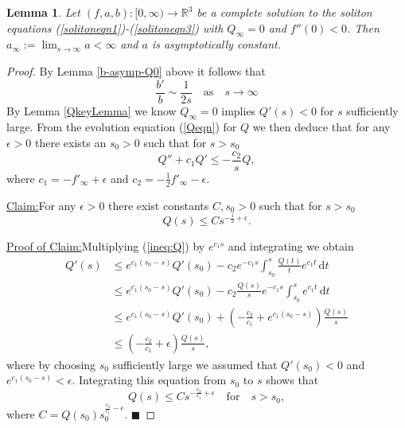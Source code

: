 \documentclass{amsart}
\newtheorem{lem}[thm]{Lemma}
\theoremstyle{definition}
\theoremstyle{remark}
\numberwithin{equation}{section}
\newcommand{\R}{\mathbb{R}}  %
\newenvironment{claim}[1]{\par\noindent\underline{Claim:}\space#1}{}
\newenvironment{claimproof}[1]{\par\noindent\underline{Proof of Claim:}\space#1}{\hfill $\blacksquare$}
\begin{document}
\begin{lem}
\label{a-asymp-Q0}
Let $(f,a,b): [0,\infty) \rightarrow \R^3$ be a complete solution to the soliton equations (\ref{solitoneqn1})-(\ref{solitoneqn3}) with $Q_\infty = 0$ and $f''(0) < 0$. Then $a_{\infty} := \lim_{s\rightarrow \infty} a <\infty$ and $a$ is asymptotically constant.
\end{lem}
\begin{proof}
By Lemma \ref{b-asymp-Q0} above it follows that 
\begin{equation*}
\frac{b'}{b} \sim \frac{1}{2s} \quad \textrm{as} \quad s \rightarrow \infty
\end{equation*}
By Lemma \ref{QkeyLemma} we know $Q_{\infty} = 0$ implies $Q'(s) < 0$ for $s$ sufficiently large. From the evolution equation (\ref{Qeqn}) for $Q$
we then deduce that for any $\epsilon > 0$ there exists an $s_0 > 0$ such that for $s > s_0$
\begin{equation}
\label{ineq:Q}
Q'' + c_1 Q' \leq -\frac{c_2}{s} Q,
\end{equation}
where $c_1  = -f'_{\infty} + \epsilon$ and $c_2 = -\frac{1}{2} f'_{\infty} - \epsilon $. 
\vspace{1em}
\begin{claim}
For any $\epsilon >0$ there exist constants $C, s_0 >0$ such that for $s > s_0$
\begin{equation*}
Q(s) \leq C s^{-\frac{1}{2} + \epsilon}.
\end{equation*}
\end{claim}
\begin{claimproof}
Multiplying (\ref{ineq:Q}) by $e^{c_1 s}$ and integrating we obtain
\begin{align*}
Q'(s) &\leq e^{c_1\left(s_0-s\right)} Q'(s_0) - c_2 e^{-c_1 s} \int_{s_0}^s \frac{Q(t)}{t} e^{c_1 t}  \, \mathrm{d}t \\
	  &\leq e^{c_1\left(s_0-s\right)} Q'(s_0) - c_2 \frac{Q(s)}{s} e^{-c_1 s} \int_{s_0}^s  e^{c_1 t} \, \mathrm{d}t \\
	  & \leq e^{c_1(s_0-s)} Q'(s_0) + \left( - \frac{c_2}{c_1} + e^{c_1 \left(s_0 - s\right)} \right) \frac{Q(s)}{s} \\
	  & \leq \left(-\frac{c_2}{c_1}+\epsilon\right) \frac{Q(s)}{s},
\end{align*}
where by choosing $s_0$ sufficiently large we assumed that $Q'(s_0) < 0$ and $e^{c_1 \left(s_0 - s\right)} < \epsilon$.
Integrating this equation from $s_0$ to $s$ shows that 
\begin{equation*}
Q(s) \leq C s^{-\frac{c_2}{c_1} + \epsilon} \quad \text{for} \quad s > s_0,
\end{equation*}
where $C = Q(s_0)s_0^{\frac{c_2}{c_1}-\epsilon}$.
\end{claimproof}


\end{proof}
\end{document}
